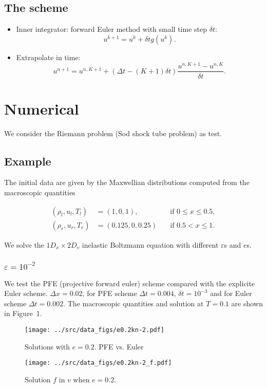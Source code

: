 \documentclass[reqno]{amsart}
\begin{document}
\subsection{The scheme}
\begin{itemize}
  \item Inner integrator: forward Euler method with small time step $\delta t$:
        $$u^{k+1} = u^k + \delta t g(u^k).$$
  \item Extrapolate in time:
        $$ u^{n+1} = u^{n,K+1} + (\Delta t - (K+1)\delta t)\frac{u^{n,K+1} - u^{n,K}}{\delta t}.$$
\end{itemize}



\section{Numerical}

We consider the Riemann problem (Sod shock tube problem) as test.
\subsection{Example}

The initial data are given by the Maxwellian distributions computed from the macroscopic quantities

\begin{align}
  (\rho_l, u_l, T_l) &= (1, 0, 1), \quad &\text{if } 0\leq x\leq 0.5, \\
  (\rho_r, u_r, T_r) &= (0.125, 0, 0.25) \quad &\text{if }0.5<x\leq 1.
\end{align}

We solve the $1D_x\times 2D_v$ inelastic Boltzmann equation with different $\varepsilon$s and $e$s.

\subsubsection{$\varepsilon=10^{-2}$}

We test the PFE (projective forward euler) scheme compared with the explicite Euler scheme. $\Delta x=0.02$,  for PFE scheme $\Delta t=0.004$, $\delta t=10^{-3}$ and for Euler scheme $\Delta t = 0.002$. The macroscopic quantities and solution at $T=0.1$ are shown in Figure~1.

\begin{figure}
\centering
\texttt{[image: ../src/data\_figs/e0.2kn-2.pdf]}
\caption{Solutions with $e=0.2$. PFE vs. Euler}
\end{figure}
\begin{figure}
  \centering
  \texttt{[image: ../src/data\_figs/e0.2kn-2\_f.pdf]}
  \caption{Solution $f$ in $v$ when $e=0.2$.}
\end{figure}
\end{document}
